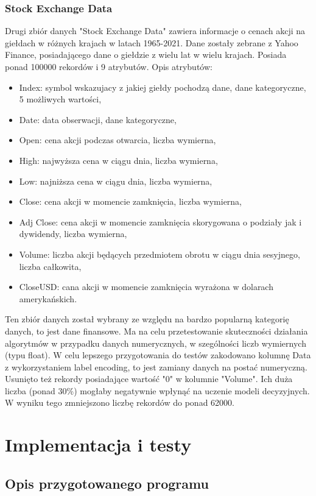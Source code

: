 \documentclass[12pt,twoside]{article}
\begin{document}
\subsubsection{Stock Exchange Data}

Drugi zbiór danych "Stock Exchange Data" zawiera informacje o cenach akcji na giełdach w różnych krajach w latach 1965-2021.
Dane zostały zebrane z Yahoo Finance, posiadającego dane o giełdzie z wielu lat w wielu krajach.
Posiada ponad 100000 rekordów i 9 atrybutów. \cite{stock} Opis atrybutów:
\begin{itemize}[label=-,labelsep=0.4cm, leftmargin=1.25cm]
    \item Index: symbol wskazujacy z jakiej giełdy pochodzą dane, dane kategoryczne, 5 możliwych wartości,
    \item Date: data obserwacji, dane kategoryczne,
    \item Open: cena akcji podczas otwarcia, liczba wymierna,
    \item High: najwyższa cena w ciągu dnia, liczba wymierna,
    \item Low: najniższa cena w ciągu dnia, liczba wymierna,
    \item Close: cena akcji w momencie zamknięcia, liczba wymierna,
    \item Adj Close: cena akcji w momencie zamknięcia skorygowana o podziały jak i dywidendy, liczba wymierna,
    \item Volume: liczba akcji będących przedmiotem obrotu w ciągu dnia sesyjnego, liczba całkowita,
    \item CloseUSD: cana akcji w momencie zamknięcia wyrażona w dolarach amerykańskich.
\end{itemize}
Ten zbiór danych został wybrany ze względu na bardzo popularną kategorię danych, to jest dane finansowe.
Ma na celu przetestowanie skuteczności działania algorytmów w przypadku danych numerycznych,
w szególności liczb wymiernych (typu float).
W celu lepszego przygotowania do testów zakodowano kolumnę Data z wykorzystaniem label encoding,
to jest zamiany danych na postać numeryczną.
Usunięto też rekordy posiadające wartość "0" w kolumnie "Volume".
Ich duża liczba (ponad 30\%) mogłaby negatywnie wpłynąć na uczenie modeli decyzyjnych.
W wyniku tego zmniejszono liczbę rekordów do ponad 62000.


\clearpage
\section{Implementacja i testy}
\subsection{Opis przygotowanego programu}
\end{document}
